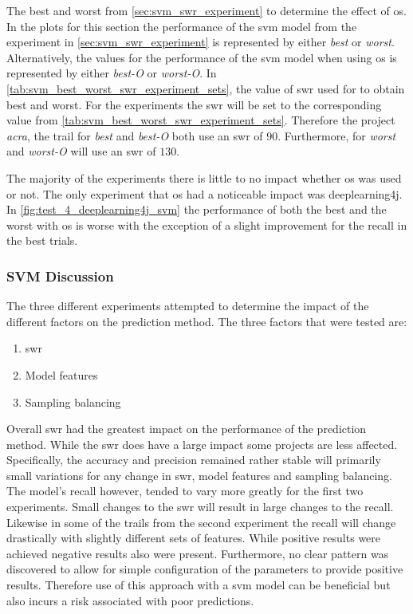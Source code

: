 The best and worst from \autoref{sec:svm_swr_experiment} to determine the effect of \gls{os}. In the plots for this section the performance of the \gls{svm} model from the experiment in \autoref{sec:svm_swr_experiment} is represented by either \textit{best} or \textit{worst}. Alternatively, the values for the performance of the \gls{svm} model when using \gls{os} is represented by either \textit{best-O} or \textit{worst-O}. In \autoref{tab:svm_best_worst_swr_experiment_sets}, the value of \gls{swr} used for to obtain best and worst. For the experiments the \gls{swr} will be set to the corresponding value from \autoref{tab:svm_best_worst_swr_experiment_sets}. Therefore the project \textit{acra}, the trail for \textit{best} and \textit{best-O} both use an \gls{swr} of $90$. Furthermore, for \textit{worst} and \textit{worst-O} will use an \gls{swr} of $130$.

The majority of the experiments there is little to no impact whether \gls{os} was used or not. The only experiment that \gls{os} had a noticeable impact was deeplearning4j. In \autoref{fig:test_4_deeplearning4j_svm} the performance of both the best and the worst with \gls{os} is worse with the exception of a slight improvement for the recall in the best trials.

\subsubsection{SVM Discussion}
\label{subsec:svm_discussion}

The three different experiments attempted to determine the impact of the different factors on the prediction method. The three factors that were tested are:
\begin{enumerate}
\item \gls{swr}
\item Model features
\item Sampling balancing
\end{enumerate}
Overall \gls{swr} had the greatest impact on the performance of the prediction method. While the \gls{swr} does have a large impact some projects are less affected. Specifically, the accuracy and precision remained rather stable will primarily small variations for any change in \gls{swr}, model features and sampling balancing. The model's recall however, tended to vary more greatly for the first two experiments. Small changes to the \gls{swr} will result in large changes to the recall. Likewise in some of the trails from the second experiment the recall will change drastically with slightly different sets of features. While positive results were achieved negative results also were present. Furthermore, no clear pattern was discovered to allow for simple configuration of the parameters to provide positive results. Therefore use of this approach with a \gls{svm} model can be beneficial but also incurs a risk associated with poor predictions.   

